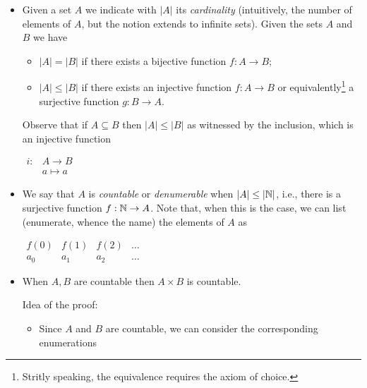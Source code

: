 \begin{itemize}
\item Given a set $A$ we indicate with $|A|$ its \emph{cardinality}
  (intuitively, the number of elements of $A$, but the notion extends
  to infinite sets). Given the sets $A$ and $B$ we have
  \begin{itemize}
  \item $|A| = |B|$ if there exists a bijective function $f : A \to B$;
  \item $|A| \leq |B|$ if there exists an injective function
    $f: A \to B$ or equivalently\footnote{Stritly speaking,
      the equivalence requires the axiom of choice.} a surjective
    function $g : B \to A$.
  \end{itemize}
  Observe that if $A \subseteq B$ then $|A| \leq |B|$ as witnessed by
  the inclusion, which is an injective function
  \begin{center}
    $\begin{array}{cc}
       i: & A \to B  \\
          & a \mapsto a
     \end{array}$
   \end{center}

\item We say that $A$ is \emph{countable} or \emph{denumerable} when
  $|A| \leq |\mathbb{N}|$, i.e., there is a surjective function
  $f: \mathbb{N} \to A$. Note that, when this is the case, we can
  list (enumerate, whence the name) the elements of $A$ as
  \begin{center}
    $\begin{array}{cccc}
      f(0) & f(1) & f(2) & \dots\\
      a_0  & a_1  & a_2 & \dots
    \end{array}
    $
  \end{center}

\item When $A, B$ are countable then $A\times B$ is countable.

  Idea of the proof:
  \begin{itemize}
  \item Since $A$ and $B$ are countable, we can consider the
    corresponding enumerations


\end{itemize}
\end{itemize}

